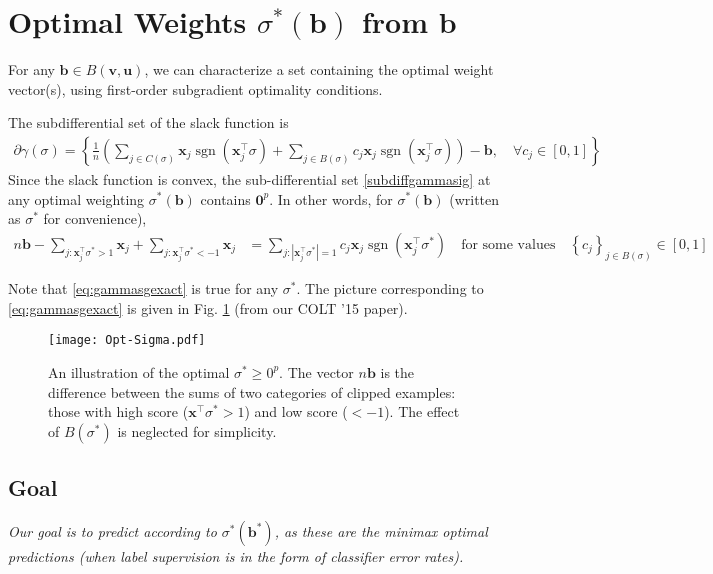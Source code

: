 \documentclass{article}
\newcommand{\vx}{\mathbf{x}}
\newcommand{\vb}{\mathbf{b}}
\newcommand{\vu}{\mathbf{u}}
\newcommand{\vv}{\mathbf{v}}
\newcommand{\vzero}{\mathbf{0}}
\DeclareMathOperator{\sgn}{sgn}
\newcommand{\abs}[1]{\left| #1 \right|}
\newcommand{\lrp}[1]{\left(#1\right)}
\newcommand{\lrsetb}[1]{\left\{#1\right\}}
\begin{document}
\section{Optimal Weights $\sigma^* (\vb)$ from $\vb$}

For any $\vb \in B (\vv,\vu)$, 
we can characterize a set containing the optimal weight vector(s), 
using first-order subgradient optimality conditions. 

The subdifferential set of the slack function is 
\begin{align}
\label{subdiffgammasig}
\partial \gamma (\sigma) 
= \left\{ \frac{1}{n} \lrp{ \sum_{j \in C(\sigma)} \vx_j \sgn(\vx_j^\top \sigma) 
+ \sum_{j \in B(\sigma)} c_j \vx_j \sgn(\vx_j^\top \sigma) } - \vb
, \quad \forall c_j \in [0,1]  \right\}
\end{align}
Since the slack function is convex, 
the sub-differential set \eqref{subdiffgammasig} at any optimal weighting $\sigma^* (\vb)$ contains $\vzero^p$. 
In other words, for $\sigma^* (\vb)$ (written as $\sigma^*$ for convenience),
\begin{align}
\label{eq:gammasgexact}
n \vb - \sum_{j : \vx_{j}^\top \sigma^* > 1} \vx_{j} + \sum_{j : \vx_{j}^\top \sigma^* < -1} \vx_{j} 
&= \sum_{j : \abs{\vx_{j}^\top \sigma^*} = 1} c_j \vx_{j} \sgn(\vx_{j}^\top \sigma^*)
\quad \mbox{for some values} \quad
\lrsetb{c_j}_{j \in B(\sigma)} \in [0,1]
\end{align} 

Note that \eqref{eq:gammasgexact} is true for any $\sigma^*$. 
The picture corresponding to \eqref{eq:gammasgexact} is given in Fig. \ref{fig:optsigma} (from our COLT '15 paper). 
\begin{figure}
\label{fig:optsigma}
\centering
\texttt{[image: Opt-Sigma.pdf]}
\caption{\small An illustration of the optimal $\sigma^* \geq 0^p$. 
The vector $n \vb$ is the difference between the sums of two categories of clipped examples: 
those with high score ($\vx^\top \sigma^* > 1$) and low score ($< -1$).
The effect of $B (\sigma^*)$ is neglected for simplicity. 
}
\end{figure}



\subsection{Goal}
\label{sec:goal}

\emph{Our goal is to predict according to $\sigma^* (\vb^*)$, as these are the minimax optimal predictions 
(when label supervision is in the form of classifier error rates).}
\end{document}
